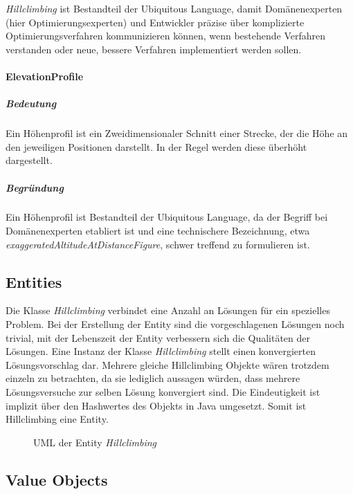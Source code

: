 \textit{Hillclimbing} ist Bestandteil der Ubiquitous Language, damit Domänenexperten (hier Optimierungsexperten) und Entwickler präzise über komplizierte Optimierungsverfahren kommunizieren können, wenn bestehende Verfahren verstanden oder neue, bessere Verfahren implementiert werden sollen.

\paragraph{ElevationProfile}

\subparagraph{Bedeutung}

Ein Höhenprofil ist ein Zweidimensionaler Schnitt einer Strecke, der die Höhe an den jeweiligen Positionen darstellt. In der Regel werden diese überhöht dargestellt.

\subparagraph{Begründung}

Ein Höhenprofil ist Bestandteil der Ubiquitous Language, da der Begriff bei Domänenexperten etabliert ist und eine technischere Bezeichnung, etwa \textit{exaggeratedAltitudeAtDistanceFigure}, schwer treffend zu formulieren ist.

\subsection{Entities}

Die Klasse \textit{Hillclimbing} verbindet eine Anzahl an Lösungen für ein spezielles Problem. 
Bei der Erstellung der Entity sind die vorgeschlagenen Lösungen noch trivial, mit der Lebenszeit der Entity verbessern sich die Qualitäten der Lösungen.
Eine Instanz der Klasse \textit{Hillclimbing} stellt einen konvergierten Lösungsvorschlag dar.
Mehrere gleiche Hillclimbing Objekte wären trotzdem einzeln zu betrachten, da sie lediglich aussagen würden, dass mehrere Lösungsversuche zur selben Lösung konvergiert sind. Die Eindeutigkeit ist implizit über den Hashwertes des Objekts in Java umgesetzt.
Somit ist Hillclimbing eine Entity.

\begin{figure}[H]
  \centering
  
  \caption{UML der Entity \textit{Hillclimbing}}
\end{figure}

\subsection{Value Objects}

